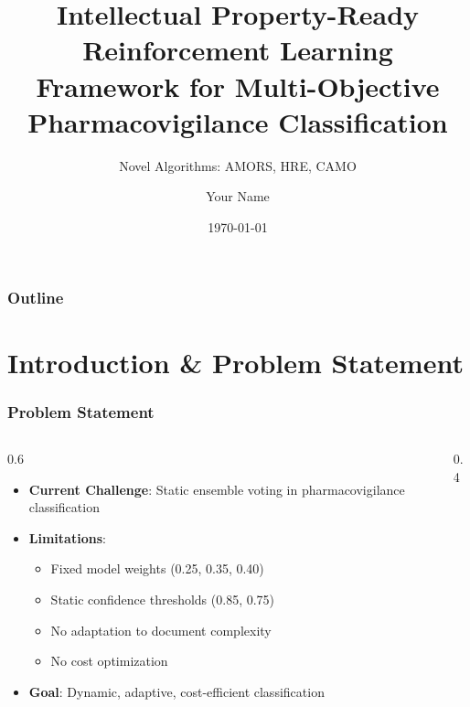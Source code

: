 \documentclass{beamer}
\title[IP RL Framework]{Intellectual Property-Ready Reinforcement Learning Framework for Multi-Objective Pharmacovigilance Classification}
\subtitle{Novel Algorithms: AMORS, HRE, CAMO}
\author[Your Name]{Your Name}
\institute[Your Institution]{Your Institution}
\date{\today}
\begin{document}
\begin{frame}
\titlepage
\end{frame}

\begin{frame}
\frametitle{Outline}
\tableofcontents
\end{frame}

\section{Introduction \& Problem Statement}

\begin{frame}
\frametitle{Problem Statement}
\begin{columns}
\begin{column}{0.6\textwidth}
\begin{itemize}
\item \textbf{Current Challenge}: Static ensemble voting in pharmacovigilance classification
\item \textbf{Limitations}: 
    \begin{itemize}
    \item Fixed model weights (0.25, 0.35, 0.40)
    \item Static confidence thresholds (0.85, 0.75)
    \item No adaptation to document complexity
    \item No cost optimization
    \end{itemize}
\item \textbf{Goal}: Dynamic, adaptive, cost-efficient classification
\end{itemize}
\end{column}
\begin{column}{0.4\textwidth}
\begin{center}
\end{center}
\end{column}
\end{columns}
\end{frame}
\end{document}

